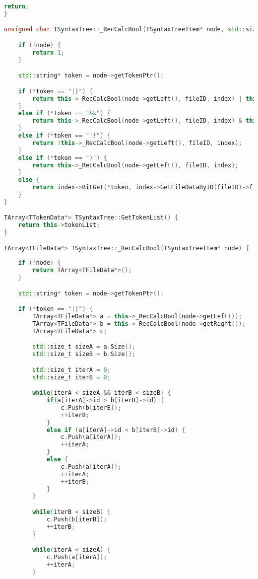 \begin{lstlisting}[language=C++]
    return;
}

unsigned char TSyntaxTree::_RecCalcBool(TSyntaxTreeItem* node, std::size_t fileID, TBitIndex* index) {

    if (!node) {
        return 1;
    }

    std::string* token = node->getTokenPtr();

    if (*token == "||") {
        return this->_RecCalcBool(node->getLeft(), fileID, index) | this->_RecCalcBool(node->getRight(), fileID, index);
    }
    else if (*token == "&&") {
        return this->_RecCalcBool(node->getLeft(), fileID, index) & this->_RecCalcBool(node->getRight(), fileID, index);
    }
    else if (*token == "!!") {
        return !this->_RecCalcBool(node->getLeft(), fileID, index);
    }
    else if (*token == ")") {
        return this->_RecCalcBool(node->getLeft(), fileID, index);
    }
    else {
        return index->BitGet(*token, index->GetFileDataByID(fileID)->filepath);
    }
}

TArray<TTokenData*> TSyntaxTree::GetTokenList() {
    return this->tokenList;
}

TArray<TFileData*> TSyntaxTree::_RecCalcBool(TSyntaxTreeItem* node) {
    
    if (!node) {
        return TArray<TFileData*>();
    }

    std::string* token = node->getTokenPtr();

    if (*token == "||") {
        TArray<TFileData*> a = this->_RecCalcBool(node->getLeft());
        TArray<TFileData*> b = this->_RecCalcBool(node->getRight());
        TArray<TFileData*> c;

        std::size_t sizeA = a.Size();
        std::size_t sizeB = b.Size();

        std::size_t iterA = 0;
        std::size_t iterB = 0;

        while(iterA < sizeA && iterB < sizeB) {
            if(a[iterA]->id > b[iterB]->id) {
                c.Push(b[iterB]);
                ++iterB;
            }
            else if (a[iterA]->id < b[iterB]->id) {
                c.Push(a[iterA]);
                ++iterA;
            }
            else {
                c.Push(a[iterA]);
                ++iterA;
                ++iterB;
            }
        }

        while(iterB < sizeB) {
            c.Push(b[iterB]);
            ++iterB;
        }

        while(iterA < sizeA) {
            c.Push(a[iterA]);
            ++iterA;
        }


\end{lstlisting}
